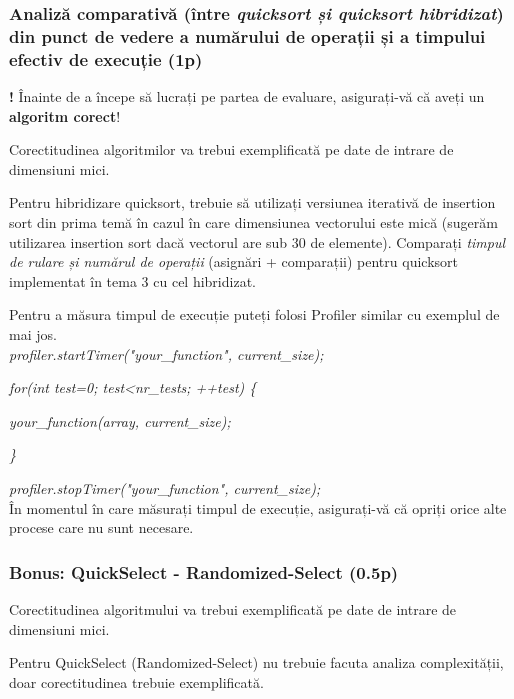 \documentclass[../ro-fa-lab.tex]{subfiles}
\begin{document}
\subsubsection{\texorpdfstring{Analiză comparativă (între \emph{quicksort
și quicksort hibridizat}) din punct de vedere a numărului de operații și
a timpului efectiv de execuție
(1p)}{Analiză comparativă (între quicksort și quicksort hibridizat) din punct de vedere a numărului de operații și a timpului efectiv de execuție (1p)}}\label{analizux103-comparativux103-uxeentre-quicksort-ux219i-quicksort-hibridizat-din-punct-de-vedere-a-numux103rului-de-operaux21bii-ux219i-a-timpului-efectiv-de-execuux21bie-1p}

\textbf{!} Înainte de a începe să lucrați pe partea de evaluare,
asigurați-vă că aveți un \textbf{algoritm corect}!

Corectitudinea algoritmilor va trebui exemplificată pe date de intrare
de dimensiuni mici.

Pentru hibridizare quicksort, trebuie să utilizați versiunea iterativă
de insertion sort din prima temă în cazul în care dimensiunea vectorului
este mică (sugerăm utilizarea insertion sort dacă vectorul are sub 30 de
elemente). Comparați \emph{timpul de rulare și numărul de operații}
(asignări + comparații) pentru quicksort implementat în tema 3 cu cel
hibridizat.

Pentru a măsura timpul de execuție puteți folosi Profiler similar cu
exemplul de mai jos.
\\

\emph{profiler.startTimer("your\_function", current\_size);}

\emph{for(int test=0; test\textless nr\_tests; ++test) \{}

\quad\emph{your\_function(array, current\_size);}

\emph{\}}

\emph{profiler.stopTimer("your\_function", current\_size);}
\\

În momentul în care măsurați timpul de execuție, asigurați-vă că opriți
orice alte procese care nu sunt necesare.

\subsubsection{Bonus: QuickSelect - Randomized-Select
(0.5p)}\label{bonus-quickselect---randomized-select-0.5p}

Corectitudinea algoritmului va trebui exemplificată pe date de intrare
de dimensiuni mici.

Pentru QuickSelect (Randomized-Select) nu trebuie facuta analiza
complexității, doar corectitudinea trebuie exemplificată.
\end{document}
